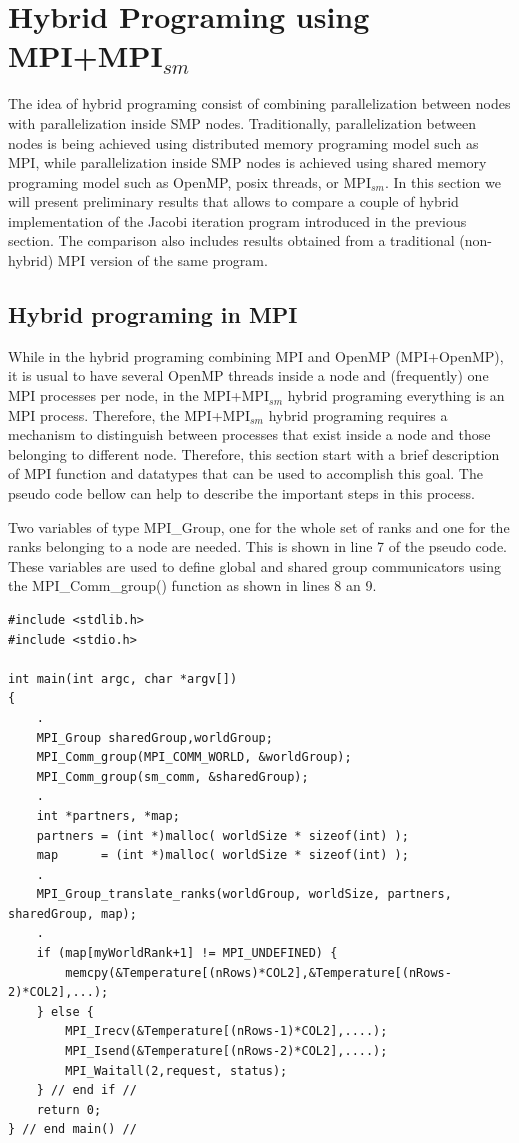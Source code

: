 \section{Hybrid Programing using MPI+MPI$_{sm}$}
The idea of hybrid programing consist of combining parallelization between nodes with parallelization inside SMP nodes. Traditionally, parallelization between nodes is being achieved using distributed memory programing model such as MPI, while parallelization inside SMP nodes is achieved using shared memory programing model such as OpenMP, posix threads, or MPI$_{sm}$. In this section we will present preliminary results that allows to compare a couple of hybrid implementation of the Jacobi iteration program introduced in the previous section. The comparison also includes results obtained from a traditional (non-hybrid) MPI version of the same program.

\medskip

\subsection*{Hybrid programing in MPI}
While in the hybrid programing combining MPI and OpenMP (MPI+OpenMP), it is usual to have several OpenMP threads inside a node and (frequently) one MPI processes per node, in the MPI+MPI$_{sm}$ hybrid programing everything is an MPI process. Therefore, the MPI+MPI$_{sm}$ hybrid programing requires a mechanism to distinguish between processes that exist inside a node and those belonging to different node. Therefore, this section start with a brief description of MPI function and datatypes that can be used to accomplish this goal. The pseudo code bellow can help to describe the important steps in this process. 

\medskip
Two variables of type MPI\_Group, one for the whole set of ranks and one for the ranks belonging to a node are needed. This is shown in line 7 of the pseudo code. These variables are used to define global and shared group communicators using the MPI\_Comm\_group() function as shown in lines 8 an 9. 


\begin{lstlisting}[style=CStyle]
#include <stdlib.h>
#include <stdio.h>

int main(int argc, char *argv[]) 
{
    .
    MPI_Group sharedGroup,worldGroup;
    MPI_Comm_group(MPI_COMM_WORLD, &worldGroup);
    MPI_Comm_group(sm_comm, &sharedGroup);
    .
    int *partners, *map;
    partners = (int *)malloc( worldSize * sizeof(int) );
    map      = (int *)malloc( worldSize * sizeof(int) );
    .
    MPI_Group_translate_ranks(worldGroup, worldSize, partners, sharedGroup, map);
    .
    if (map[myWorldRank+1] != MPI_UNDEFINED) {
        memcpy(&Temperature[(nRows)*COL2],&Temperature[(nRows-2)*COL2],...);
    } else {
        MPI_Irecv(&Temperature[(nRows-1)*COL2],....);
        MPI_Isend(&Temperature[(nRows-2)*COL2],....);
        MPI_Waitall(2,request, status);
    } // end if //  
    return 0;
} // end main() // 
\end{lstlisting}


